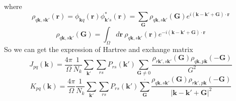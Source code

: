 \documentclass{article}
\begin{document}
            where
            \begin{equation}
                \rho_{q\textbf{k},s\textbf{k}'}(\textbf{r}) = \phi_{\textbf{k}q}(\textbf{r})\phi_{\textbf{k}'s}^*(\textbf{r}) 
                = \sum_{\textbf{G}}\rho_{q\textbf{k},s\textbf{k}'}(\textbf{G})e^{i(\textbf{k}-\textbf{k}'+\textbf{G})\cdot\textbf{r}}
            \end{equation}
            \begin{equation}
                \rho_{q\textbf{k},s\textbf{k}'}(\textbf{G}) = \int_{\Omega}d\textbf{r}\ \rho_{q\textbf{k},s\textbf{k}'}(\textbf{r})
                e^{-i(\textbf{k}-\textbf{k}'+\textbf{G})\cdot\textbf{r}}
            \end{equation}
            So we can get the expression of Hartree and exchange matrix
            \begin{equation}
                J_{pq}(\textbf{k}) = \frac{4\pi}{\Omega}\frac{1}{N_k}\sum_{\textbf{k}'}\sum_{rs}
                P_{rs}(\textbf{k}')\sum_{\textbf{G}\neq 0}\frac{\rho_{r\textbf{k}',s\textbf{k}'}(\textbf{G})\rho_{q\textbf{k},p\textbf{k}}(-\textbf{G})}{G^2}
            \end{equation}
            \begin{equation}
                K_{pq}(\textbf{k}) = \frac{4\pi}{\Omega}\frac{1}{N_k}\sum_{\textbf{k}'}\sum_{rs}P_{rs}(\textbf{k}')
                \sum_{\textbf{G}}^{,}\frac{\rho_{q\textbf{k},s\textbf{k}'}(\textbf{G})
                \rho_{r\textbf{k}',p\textbf{k}}(-\textbf{G})}{\left|\textbf{k}-\textbf{k}'+\textbf{G}\right|^2}
            \end{equation}
\end{document}
